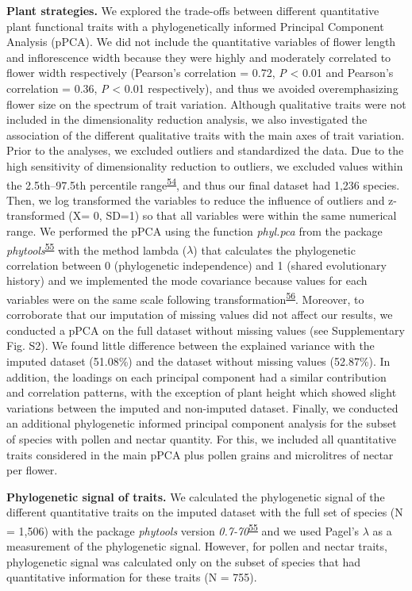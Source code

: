 \documentclass[12pt,a4paper,]{article}
\begin{document}
\textbf{Plant strategies.} We explored the trade-offs between different
quantitative plant functional traits with a phylogenetically informed
Principal Component Analysis (pPCA). We did not include the quantitative
variables of flower length and inflorescence width because they were
highly and moderately correlated to flower width respectively (Pearson's
correlation = 0.72, \emph{P} \textless{} 0.01 and Pearson's correlation
= 0.36, \emph{P} \textless{} 0.01 respectively), and thus we avoided
overemphasizing flower size on the spectrum of trait variation. Although
qualitative traits were not included in the dimensionality reduction
analysis, we also investigated the association of the different
qualitative traits with the main axes of trait variation. Prior to the
analyses, we excluded outliers and standardized the data. Due to the
high sensitivity of dimensionality reduction to outliers, we excluded
values within the 2.5th--97.5th percentile
range\textsuperscript{\protect\hyperlink{ref-legendre2012}{54}}, and
thus our final dataset had 1,236 species. Then, we log transformed the
variables to reduce the influence of outliers and z-transformed (X= 0,
SD=1) so that all variables were within the same numerical range. We
performed the pPCA using the function \emph{phyl.pca} from the package
\emph{phytools}\textsuperscript{\protect\hyperlink{ref-revell2012}{55}}
with the method lambda (\(\lambda\)) that calculates the phylogenetic
correlation between 0 (phylogenetic independence) and 1 (shared
evolutionary history) and we implemented the mode covariance because
values for each variables were on the same scale following
transformation\textsuperscript{\protect\hyperlink{ref-abdi2010}{56}}.
Moreover, to corroborate that our imputation of missing values did not
affect our results, we conducted a pPCA on the full dataset without
missing values (see Supplementary Fig. S2). We found little difference
between the explained variance with the imputed dataset (51.08\%) and
the dataset without missing values (52.87\%). In addition, the loadings
on each principal component had a similar contribution and correlation
patterns, with the exception of plant height which showed slight
variations between the imputed and non-imputed dataset. Finally, we
conducted an additional phylogenetic informed principal component
analysis for the subset of species with pollen and nectar quantity. For
this, we included all quantitative traits considered in the main pPCA
plus pollen grains and microlitres of nectar per flower.

\textbf{Phylogenetic signal of traits.} We calculated the phylogenetic
signal of the different quantitative traits on the imputed dataset with
the full set of species (N = 1,506) with the package \emph{phytools}
version
\emph{0.7-70}\textsuperscript{\protect\hyperlink{ref-revell2012}{55}}
and we used Pagel's \(\lambda\) as a measurement of the phylogenetic
signal. However, for pollen and nectar traits, phylogenetic signal was
calculated only on the subset of species that had quantitative
information for these traits (N = 755).
\end{document}
